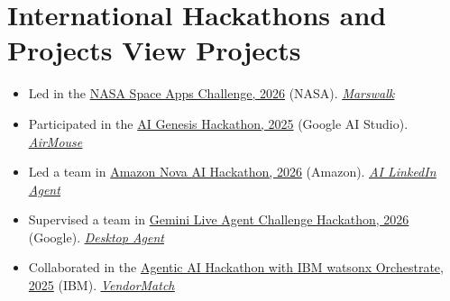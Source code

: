 \documentclass[a4paper,12pt]{article}
\begin{document}
\section{International Hackathons and Projects \hfill \small{View Projects}}
\begin{itemize}
    \item Led in the \href{https://www.spaceappschallenge.org/2026/find-a-team/cosmobyte/?tab=project}{NASA Space Apps Challenge, 2026} (NASA).
    \hfill \textit{
        \href{https://lnkd.in/p/dAaAzvfe}{\underline{Marswalk}}
    }
    \item Participated in the \href{https://lablab.ai/ai-hackathons/ai-genesis/taurids/airmouse}{AI Genesis Hackathon, 2025} (Google AI Studio).
    \hfill \textit{
        \href{https://www.linkedin.com/posts/aahmedfaraz_hackathon-ai-electron-activity-7397141415165726720-tlQq?utm_source=share&utm_medium=member_desktop&rcm=ACoAADdJH-cBzPnm9JIV3RhrpK_TvX28bFX_rEY}{\underline{AirMouse}}
    }
    \item Led a team in \href{https://devpost.com/software/ai-linkedin-agent?ref_content=my-projects-tab&ref_feature=my_projects}{Amazon Nova AI Hackathon, 2026} (Amazon).
    \hfill \textit{
        \href{https://www.linkedin.com/posts/aahmedfaraz_amazonnova-hackathon-devpost-activity-7439555829818761217-_tjk?utm_source=share&utm_medium=member_desktop&rcm=ACoAADdJH-cBzPnm9JIV3RhrpK_TvX28bFX_rEY}{\underline{AI LinkedIn Agent}}
    }
    \item Supervised a team in \href{https://devpost.com/software/personal-desktop-agent?ref_content=my-projects-tab&ref_feature=my_projects}{Gemini Live Agent Challenge Hackathon, 2026} (Google).
    \hfill \textit{
        \href{https://www.linkedin.com/posts/aahmedfaraz_hackathon-devpost-aiagents-activity-7439699674476732417-IWqk?utm_source=share&utm_medium=member_desktop&rcm=ACoAADdJH-cBzPnm9JIV3RhrpK_TvX28bFX_rEY}{\underline{Desktop Agent}}
    }
    \item Collaborated in the \href{https://lablab.ai/ai-hackathons/agentic-ai-hackathon-ibm-watsonx-orchestrate/centaurus/vendormatch}{Agentic AI Hackathon with IBM watsonx Orchestrate, 2025} (IBM).
    \hfill \textit{
        \href{https://www.linkedin.com/posts/aahmedfaraz_ibm-watsonx-agenticai-activity-7403253209386979328-dxEk?utm_source=share&utm_medium=member_desktop&rcm=ACoAADdJH-cBzPnm9JIV3RhrpK_TvX28bFX_rEY}{\underline{VendorMatch}}
}
\end{itemize}
\end{document}
